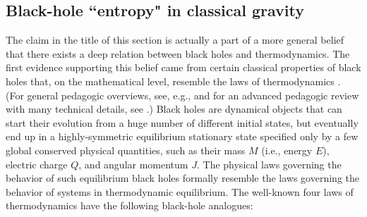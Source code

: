 \documentclass[12pt]{article}
\begin{document}
\subsection{Black-hole ``entropy" in classical gravity}

The claim in the title of this section
is actually a part of a more general belief that there exists 
a deep relation between black holes and thermodynamics. The first evidence 
supporting this belief came from certain classical properties of black holes
that, on the mathematical level, resemble the laws of thermodynamics 
\cite{beken,hawk2}. 
(For general pedagogic overviews, see, e.g., \cite{carrol,hawk3}
and for an advanced pedagogic review with many technical details, 
see \cite{town}.) Black holes are dynamical objects that can start
their evolution from a huge number of different initial states, 
but eventually end up in a highly-symmetric equilibrium stationary state 
specified only by a few global conserved physical quantities, 
such as their mass $M$ (i.e., energy $E$), electric charge $Q$, 
and angular momentum $J$. The physical laws governing the behavior
of such equilibrium black holes formally resemble the laws 
governing the behavior of systems in 
thermodynamic equilibrium. The well-known four laws of thermodynamics 
have the following black-hole analogues:
\end{document}
